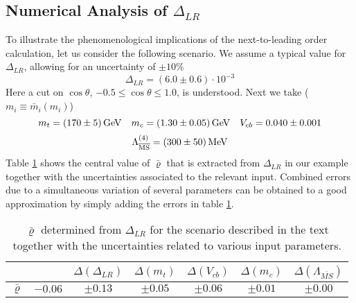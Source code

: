 \subsection{Numerical Analysis of $\Delta_{LR}$}
\label{sec:KLmm:NumericalDeLR}
To illustrate the phenomenological implications of the next-to-leading
order calculation, let us consider the following scenario. We assume a
typical value for $\Delta_{LR}$, allowing for an uncertainty of $\pm
10\%$
\begin{equation}\label{delrnum}
\Delta_{LR}=(6.0\pm 0.6)\cdot 10^{-3}
\end{equation}
Here a cut on $\cos\theta$, $-0.5\leq\cos\theta\leq 1.0$,
is understood.
Next we take ($m_i\equiv\bar m_i(m_i)$)
\begin{equation}\label{mtcV}
m_t=(170\pm 5)\, {\rm GeV}\quad m_c=(1.30\pm 0.05)\, {\rm GeV}\quad
V_{cb}=0.040\pm 0.001  
\end{equation}
\begin{equation}\label{lams}
\Lambda_{\overline{\rm MS}}^{(4)}=(300 \pm 50)\, {\rm MeV}   
\end{equation}
Table \ref{tab:rhoDeLR} shows the central value of $\bar\varrho$ that
is extracted from $\Delta_{LR}$ in our example together with the
uncertainties associated to the relevant input. Combined errors due to
a simultaneous variation of several parameters can be obtained to a
good approximation by simply adding the errors in table \ref{tab:rhoDeLR}.

\begin{table}[htb]
\caption[]{$\bar\varrho$ determined from $\Delta_{LR}$ for the scenario
described in the text together with the uncertainties related to
various input parameters.
\label{tab:rhoDeLR}}
\begin{center}
\begin{tabular}{|c||c||c|c|c|c|c|}
&&$\Delta(\Delta_{LR})$&$\Delta(m_t)$
&$\Delta(V_{cb})$&$\Delta(m_c)$&$\Delta(\Lambda_{\overline{MS}})$
\\ \hline
$\bar\varrho$&$-0.06$&$\pm 0.13$&$\pm 0.05$&$\pm 0.06$&$\pm 0.01$&
$\pm 0.00$
\end{tabular}
\end{center}
\end{table}

